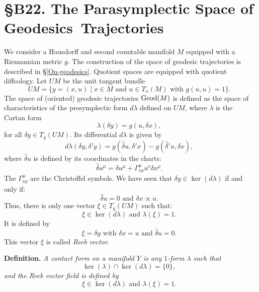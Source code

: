 

\chapter*{\S B22. The Parasymplectic Space of \hbox{Geodesics Trajectories}}
\setcounter{footnote}{0}


\begin{abstract}
  We describe the parasymplectic structure on the space of geodesics trajectories of any Riemannian manifold.
\end{abstract}


We consider a Hausdorff and second countable manifold $M$ equipped with a Riemannian metric $g$.
The construction of the space of geodesic trajectories is described in §\ref{On-geodesics}.
Quotient spaces are equipped with quotient diffeology.
Let $ UM$ be the unit tangent bundle
$$
  UM = \{y = (x,u) \mid x \in M \text{ and } u \in T_x(M) \text{ with } g(u,u) = 1 \}.
  $$
The space of (oriented) geodesic trajectories $\operatorname{Geod}(M)$ is defined as the space of characteristics of the presymplectic form $d\lambda$ defined on $UM$,
where $\lambda$ is the Cartan form
$$
  \lambda (\delta y) = g(u, \delta x),
  $$
for all $\delta y \in T_y(UM)$.
Its differential $d\lambda$ is given by
$$
  d\lambda(\delta y, \delta'y) = g(\hat \delta u,\delta'x) - g(\hat \delta' u,\delta x),
  $$
where $\hat \delta u$ is defined by its coordinates in the charts:
$$
  \hat \delta u^\mu = \delta u^\mu + \Gamma^\mu_{\nu\rho}u^\nu\delta x^\rho.
  $$
The $\Gamma^\mu_{\nu\rho}$ are the Christoffel symbols.
We have seen that $\delta y \in \ker(d\lambda)$ if and only if:
$$
  \hat\delta u = 0 \text{ and } \delta x \propto u.
  $$
Thus,
there is only one vector $\xi \in T_y(UM)$ such that:
$$
  \xi \in \ker(d\lambda) \text{ and } \lambda(\xi) = 1.
  $$
It is defined by
$$
  \xi = \delta y \text{ with } \delta x = u \text{ and } \hat\delta u = 0.
  $$%
This vector $\xi$ is called \emph{Reeb vector}.

\textbf{Definition.} {\it A \emph{contact form} on a manifold $Y$ is any $1$-form $\lambda$ such that
$$
\ker(\lambda) \cap \ker(d\lambda) = \{0\},
$$%
and the \emph{Reeb vector field} is defined by
$$
  \xi \in \ker(d\lambda) \text{ and } \lambda(\xi) = 1.
  $$}%

